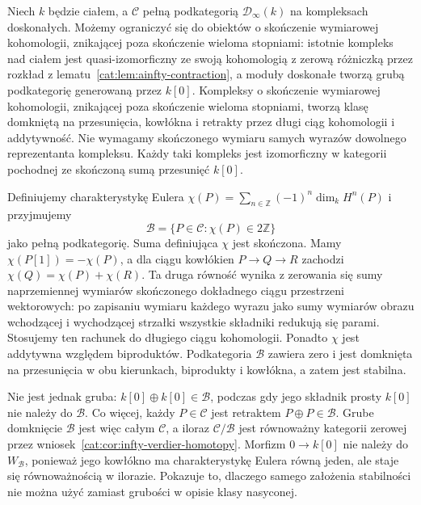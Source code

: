 \begin{przyklad}\label{cat:ex:infty-verdier-not-thick}
Niech $k$ będzie ciałem, a $\mathcal C$ pełną podkategorią $\mathcal D_\infty(k)$ na kompleksach doskonałych. Możemy ograniczyć się do obiektów o skończenie wymiarowej kohomologii, znikającej poza skończenie wieloma stopniami: istotnie kompleks nad ciałem jest quasi-izomorficzny ze swoją kohomologią z zerową różniczką przez rozkład z lematu~\ref{cat:lem:ainfty-contraction}, a moduły doskonałe tworzą grubą podkategorię generowaną przez $k[0]$. Kompleksy o skończenie wymiarowej kohomologii, znikającej poza skończenie wieloma stopniami, tworzą klasę domkniętą na przesunięcia, kowłókna i retrakty przez długi ciąg kohomologii i addytywność. Nie wymagamy skończonego wymiaru samych wyrazów dowolnego reprezentanta kompleksu. Każdy taki kompleks jest izomorficzny w kategorii pochodnej ze skończoną sumą przesunięć $k[0]$.

Definiujemy charakterystykę Eulera $\chi(P)=\sum_{n\in\mathbb Z}(-1)^n\dim_k H^n(P)$ i przyjmujemy
\[
 \mathcal B=\{P\in\mathcal C:\chi(P)\in 2\mathbb Z\}
\]
jako pełną podkategorię. Suma definiująca $\chi$ jest skończona. Mamy $\chi(P[1])=-\chi(P)$, a dla ciągu kowłókien $P\to Q\to R$ zachodzi $\chi(Q)=\chi(P)+\chi(R)$. Ta druga równość wynika z zerowania się sumy naprzemiennej wymiarów skończonego dokładnego ciągu przestrzeni wektorowych: po zapisaniu wymiaru każdego wyrazu jako sumy wymiarów obrazu wchodzącej i wychodzącej strzałki wszystkie składniki redukują się parami. Stosujemy ten rachunek do długiego ciągu kohomologii. Ponadto $\chi$ jest addytywna względem biproduktów. Podkategoria $\mathcal B$ zawiera zero i jest domknięta na przesunięcia w obu kierunkach, biprodukty i kowłókna, a zatem jest stabilna.

Nie jest jednak gruba: $k[0]\oplus k[0]\in\mathcal B$, podczas gdy jego składnik prosty $k[0]$ nie należy do $\mathcal B$. Co więcej, każdy $P\in\mathcal C$ jest retraktem $P\oplus P\in\mathcal B$. Grube domknięcie $\mathcal B$ jest więc całym $\mathcal C$, a iloraz $\mathcal C/\mathcal B$ jest równoważny kategorii zerowej przez wniosek~\ref{cat:cor:infty-verdier-homotopy}. Morfizm $0\to k[0]$ nie należy do $W_{\mathcal B}$, ponieważ jego kowłókno ma charakterystykę Eulera równą jeden, ale staje się równoważnością w ilorazie. Pokazuje to, dlaczego samego założenia stabilności nie można użyć zamiast grubości w opisie klasy nasyconej.
\end{przyklad}

